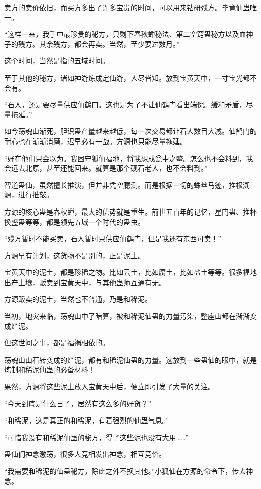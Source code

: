 \begin{this_body}
卖方的卖价依旧，而买方多出了许多宝贵的时间，可以用来钻研残方。毕竟仙蛊唯一。

“这样一来，我手中最珍贵的秘方，只剩下春秋蝉秘法、第二空窍蛊秘方以及血神子的残方。其余残方，都会再卖。当然，至少要过数月。”

这个时间，当然是指的五域时间。

至于其他的秘方，诸如神游炼成定仙游，人尽皆知。放到宝黄天中，一寸宝光都不会有。

“石人，还是要尽量供应仙鹤门。这也是为了不让仙鹤门看出端倪。缓和矛盾，尽量拖延。”

如今荡魂山渐死，胆识蛊产量越来越低，每一次交易都让石人数目大减。仙鹤门的耐心也在渐渐消磨，迟早必有一战。方源也只能尽量拖延。

“好在他们只会以为。我困守狐仙福地，将我想成瓮中之鳖。怎么也不会料到，我会远去北原，甚至还能回来。就算是那个砚石老人，也不会料到。”

智道蛊仙，虽然擅长推演，但并非凭空臆测。而是根据一切的蛛丝马迹，推根溯源，进行推敲。

方源的核心蛊是春秋蝉，最大的优势就是重生。前世五百年的记忆，星门蛊、推杯换盏蛊等等，都是领先五域一个时代的蛊虫。

“残方暂时不能买卖，石人暂时只供应仙鹤门，但是我还有东西可卖！”

方源早有计划，这货物不是别的，正是泥土。

宝黄天中的泥土，都是珍稀之物。比如云土，比如腐土，比如盐土等等。很多福地出产土壤，贩卖到宝黄天中，与其他蛊师互通有无。

方源贩卖的泥土，当然也不普通，乃是和稀泥。

当初，地灾来临，荡魂山中了暗算，被和稀泥仙蛊的力量污染，整座山都在渐渐变成烂泥。

但这世间之事，都是福祸相依的。

荡魂山山石转变成的烂泥，都有和稀泥仙蛊的力量。这放到一些蛊仙的眼中，就是炼制和稀泥仙蛊的必备材料！

果然，方源将这些泥土放入宝黄天中后，便立即引发了大量的关注。

“今天到底是什么日子，居然有这么多的好货？”

“和稀泥，这是真正的和稀泥，有着强烈的仙蛊气息。”

“可惜我没有和稀泥仙蛊的秘方，得了这些泥也没有大用……”

蛊仙们神念激荡，很多人竞相发出神念，相互竞价。

“我需要和稀泥的仙蛊秘方，除此之外不换其他。”小狐仙在方源的命令下，传去神念。


\end{this_body}
